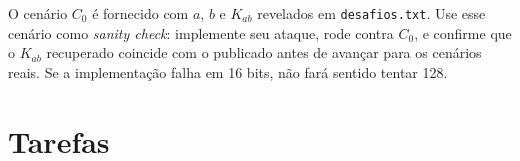\documentclass[12pt,a4paper]{article}
\begin{document}
\begin{tcolorbox}[colback=green!5, colframe=green!40!black, title=\textbf{Exemplo resolvido: $C_0$ (16 bits)}, fonttitle=\small]
\small
O cenário $C_0$ é fornecido com $a$, $b$ e $K_{ab}$ revelados em \texttt{desafios.txt}. Use esse cenário como \emph{sanity check}: implemente seu ataque, rode contra $C_0$, e confirme que o $K_{ab}$ recuperado coincide com o publicado antes de avançar para os cenários reais. Se a implementação falha em 16 bits, não fará sentido tentar 128.
\end{tcolorbox}

\section{Tarefas}
\end{document}
